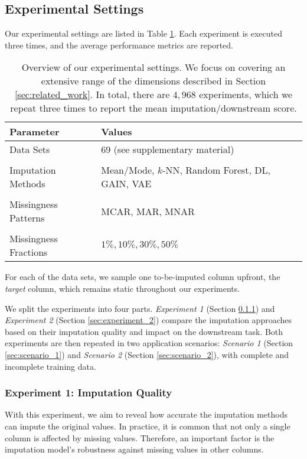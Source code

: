 \subsection{Experimental Settings}
%
Our experimental settings are listed in Table \ref{tab:experiment_settings}. Each experiment is executed three times, and the average performance metrics are reported.
%
\begin{table}
	\centering
	\begin{tabular}{ll}
		\toprule
		Parameter            & Values                                     \\ \midrule
		Data Sets             & 69 (see supplementary material)    \\
		\\[-0.5em]
		Imputation Methods              & Mean/Mode, $k$-NN, Random Forest, DL, GAIN, VAE \\
		\\[-0.5em]
		Missingness Patterns  & MCAR, MAR, MNAR                            \\
		\\[-0.5em]
		Missingness Fractions & $1\%, 10\%, 30\%, 50\%$                      \\ \bottomrule
	\end{tabular}
	\caption{Overview of our experimental settings. We focus on covering an extensive range of the dimensions described in Section \ref{sec:related_work}. In total, there are $4,968$ experiments, which we repeat three times to report the mean imputation/downstream score.}
	\label{tab:experiment_settings}
\end{table}
%
For each of the data sets, we sample one to-be-imputed column upfront, the \emph{target} column, which remains static throughout our experiments.

We split the experiments into four parts. \emph{Experiment 1} (Section \ref{sec:experiment_1}) and \emph{Experiment 2} (Section \ref{sec:experiment_2}) compare the imputation approaches based on their imputation quality and impact on the downstream task. Both experiments are then repeated in two application scenarios: \emph{Scenario 1} (Section \ref{sec:scenario_1}) and \emph{Scenario 2} (Section \ref{sec:scenario_2}), with complete and incomplete training data.


\subsubsection{Experiment 1: Imputation Quality}
\label{sec:experiment_1}
%
With this experiment, we aim to reveal how accurate the imputation methods can impute the original values. In practice, it is common that not only a single column is affected by missing values. Therefore, an important factor is the imputation model's robustness against missing values in other columns.

